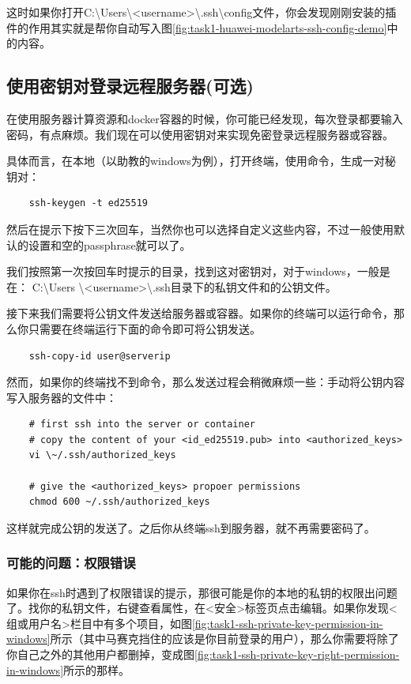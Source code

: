 这时如果你打开C:\textbackslash Users\textbackslash <username>\textbackslash .ssh\textbackslash config文件，你会发现刚刚安装的插件的作用其实就是帮你自动写入图\ref{fig:task1-huawei-modelarts-ssh-config-demo}中的内容。


\subsection{使用密钥对登录远程服务器(可选)}

在使用服务器计算资源和docker容器的时候，你可能已经发现，每次登录都要输入密码，有点麻烦。我们现在可以使用密钥对来实现免密登录远程服务器或容器。

具体而言，在本地（以助教的windows为例），打开终端，使用命令，生成一对秘钥对：
\begin{lstlisting}
    ssh-keygen -t ed25519
\end{lstlisting}
然后在提示下按下三次回车，当然你也可以选择自定义这些内容，不过一般使用默认的设置和空的passphrase就可以了。


我们按照第一次按回车时提示的目录，找到这对密钥对，对于windows，一般是在：
C:\textbackslash Users \textbackslash <username>\textbackslash .ssh目录下的私钥文件和的公钥文件。

接下来我们需要将公钥文件发送给服务器或容器。如果你的终端可以运行命令，那么你只需要在终端运行下面的命令即可将公钥发送。
\begin{lstlisting}
    ssh-copy-id user@serverip
\end{lstlisting}

然而，如果你的终端找不到命令，那么发送过程会稍微麻烦一些：手动将公钥内容写入服务器的文件中：
\begin{lstlisting}
    # first ssh into the server or container
    # copy the content of your <id_ed25519.pub> into <authorized_keys>
    vi \~/.ssh/authorized_keys
    
    # give the <authorized_keys> propoer permissions
    chmod 600 ~/.ssh/authorized_keys    
\end{lstlisting}
这样就完成公钥的发送了。之后你从终端ssh到服务器，就不再需要密码了。


\subsubsection{可能的问题：权限错误}

如果你在ssh时遇到了权限错误的提示，那很可能是你的本地的私钥的权限出问题了。找你的私钥文件，右键查看属性，在<安全>标签页点击编辑。如果你发现<组或用户名>栏目中有多个项目，如图\ref{fig:task1-ssh-private-key-permission-in-windows}所示（其中马赛克挡住的应该是你目前登录的用户），那么你需要将除了你自己之外的其他用户都删掉，变成图\ref{fig:task1-ssh-private-key-right-permission-in-windows}所示的那样。

